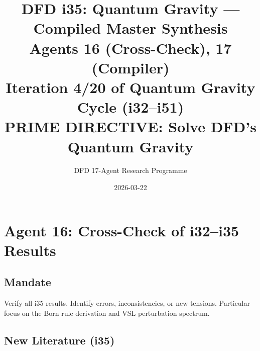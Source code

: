 \documentclass[11pt,a4paper]{article}
\title{DFD i35: Quantum Gravity --- Compiled Master Synthesis\\[6pt]
\large Agents 16 (Cross-Check), 17 (Compiler)\\[6pt]
\normalsize Iteration 4/20 of Quantum Gravity Cycle (i32--i51)\\
PRIME DIRECTIVE: Solve DFD's Quantum Gravity}
\author{DFD 17-Agent Research Programme}
\date{2026-03-22}
\begin{document}
\maketitle
\tableofcontents
\newpage

\section{Agent 16: Cross-Check of i32--i35 Results}
\label{sec:agent16}

\subsection{Mandate}

Verify all i35 results. Identify errors, inconsistencies, or new tensions. Particular focus on the Born rule derivation and VSL perturbation spectrum.

\subsection{New Literature (i35)}
\end{document}
